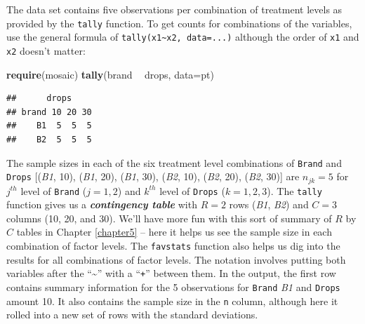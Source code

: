 \documentclass[]{book}
\newenvironment{Shaded}{\begin{snugshade}}{\end{snugshade}}
\newcommand{\KeywordTok}[1]{\textcolor[rgb]{0.13,0.29,0.53}{\textbf{#1}}}
\newcommand{\DataTypeTok}[1]{\textcolor[rgb]{0.13,0.29,0.53}{#1}}
\newcommand{\StringTok}[1]{\textcolor[rgb]{0.31,0.60,0.02}{#1}}
\newcommand{\OperatorTok}[1]{\textcolor[rgb]{0.81,0.36,0.00}{\textbf{#1}}}
\newcommand{\NormalTok}[1]{#1}
\theoremstyle{definition}
\theoremstyle{definition}
\theoremstyle{remark}
\begin{document}
\begin{Shaded}
\end{Shaded}

The data set contains five observations per combination of treatment
levels as provided by the \texttt{tally} function. To get counts for
combinations of the variables, use the general formula of
\texttt{tally(x1\textasciitilde{}x2,\ data=...)} although the order of
\texttt{x1} and \texttt{x2} doesn't matter:

\begin{Shaded}
\begin{Highlighting}[]
\KeywordTok{require}\NormalTok{(mosaic)}
\KeywordTok{tally}\NormalTok{(brand }\OperatorTok{~}\StringTok{ }\NormalTok{drops, }\DataTypeTok{data=}\NormalTok{pt)}
\end{Highlighting}
\end{Shaded}

\begin{verbatim}
##      drops
## brand 10 20 30
##    B1  5  5  5
##    B2  5  5  5
\end{verbatim}

The sample sizes in each of the six treatment level combinations of
\texttt{Brand} and \texttt{Drops} {[}(\emph{B1}, 10), (\emph{B1}, 20),
(\emph{B1}, 30), (\emph{B2}, 10), (\emph{B2}, 20), (\emph{B2}, 30){]}
are \(n_{jk} = 5\) for \(j^{th}\) level of \texttt{Brand} (\(j=1, 2\))
and \(k^{th}\) level of \texttt{Drops} (\(k=1, 2, 3\)). The
\texttt{tally} function gives us a \textbf{\emph{contingency table}}
with \(R = 2\) rows (\emph{B1}, \emph{B2}) and \(C = 3\) columns (10,
20, and 30). We'll have more fun with this sort of summary of \(R\) by
\(C\) tables in Chapter \ref{chapter5} -- here it helps us see the
sample size in each combination of factor levels. The \texttt{favstats}
function also helps us dig into the results for all combinations of
factor levels. The notation involves putting both variables after the
``\textasciitilde{}'' with a ``\texttt{+}'' between them. In the output,
the first row contains summary information for the 5 observations for
\texttt{Brand} \emph{B1} and \texttt{Drops} amount 10. It also contains
the sample size in the \texttt{n} column, although here it rolled into a
new set of rows with the standard deviations.
\end{document}
